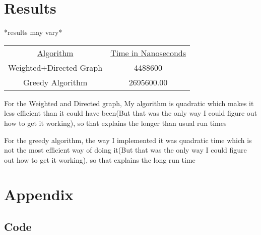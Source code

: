 \documentclass[10pt]{article}
\begin{document}
\section{Results}
*results may vary*
\begin{center}
\begin{tabular}{ |c|c| } 
 \hline
 \underline{Algorithm} & \underline{Time in Nanoseconds} \\
 Weighted+Directed Graph     & 4488600 \\ 
 Greedy Algorithm      & 2695600.00 \\  
 \hline
\end{tabular}
\end{center}
For the Weighted and Directed graph, My algorithm is quadratic which makes it less efficient than it could have been(But that was the only way I could figure out how to get it working), so that explains the longer than usual run times

\newline

For the greedy algorithm, the way I implemented it was quadratic time which is not the most efficient way of doing it(But that was the only way I could figure out how to get it working), so that explains the long run time


 



\section{Appendix}

\subsection{Code}
\end{document}
